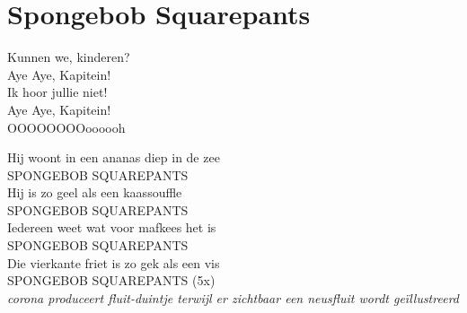 \section{Spongebob Squarepants}
Kunnen we, kinderen?\\
Aye Aye, Kapitein!\\
Ik hoor jullie niet!\\
Aye Aye, Kapitein!\\
OOOOOOOOoooooh

Hij woont in een ananas diep in de zee\\
SPONGEBOB SQUAREPANTS\\
Hij is zo geel als een kaassouffle\\
SPONGEBOB SQUAREPANTS\\
Iedereen weet wat voor mafkees het is\\
SPONGEBOB SQUAREPANTS\\
Die vierkante friet is zo gek als een vis\\
SPONGEBOB SQUAREPANTS (5x)\\

\textit{corona produceert fluit-duintje terwijl er zichtbaar een neusfluit wordt geïllustreerd}

